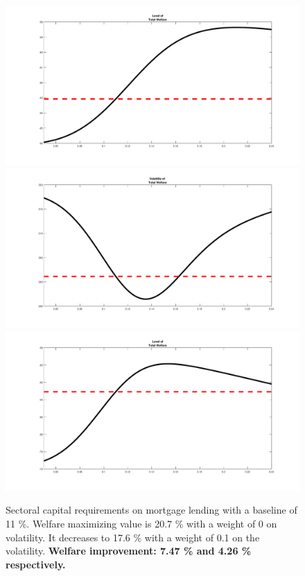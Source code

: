 \documentclass[12pt]{article}
\numberwithin{equation}{section}
\begin{document}
\begin{figure}[H]
\centering
\caption{Sectoral capital requirements on mortgage lending with a baseline of 11 \%. Welfare maximizing value is 20.7 \% with a weight of 0 on volatility. It decreases to 17.6 \% with a weight of 0.1 on the volatility.
\label{steadystate_SCR_figure}
\textbf{Welfare improvement: 7.47 \% and 4.26 \% respectively.} } 
\includegraphics[scale=0.2]{welfare_SCR_housing_level.pdf}
\includegraphics[scale=0.2]{welfare_SCR_housing_var.pdf}\\
\includegraphics[scale=0.2]{welfare_CAR_level.pdf}

\end{figure}
\end{document}
